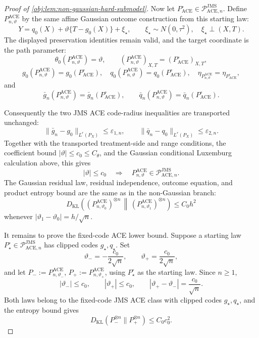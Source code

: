 \documentclass[11pt]{article}
\begin{document}
\begin{proof}[Proof of \cref{obj:lem:non-gaussian-hard-submodel}]
Now let \(P_{\mathrm{ACE}}^\circ\in\mathcal P_{\mathrm{ACE},n}^{\mathrm{JMS}}\).  Define \(P_{n,\vartheta}^{\mathrm{ACE}}\) by the same affine Gaussian outcome construction from this starting law:
\[
Y=q_0(X)+\vartheta\{T-g_0(X)\}+\xi_\star,
\qquad
\xi_\star\sim N(0,\tau^2),\quad \xi_\star\perp(X,T).
\]
The displayed preservation identities remain valid, and the target coordinate is the path parameter:
\[
\theta_0(P_{n,\vartheta}^{\mathrm{ACE}})=\vartheta,
\qquad
(P_{n,\vartheta}^{\mathrm{ACE}})_{X,T}=(P_{\mathrm{ACE}}^\circ)_{X,T},
\]
\[
g_0(P_{n,\vartheta}^{\mathrm{ACE}})=g_0(P_{\mathrm{ACE}}^\circ),\quad
q_0(P_{n,\vartheta}^{\mathrm{ACE}})=q_0(P_{\mathrm{ACE}}^\circ),\quad
\eta_{P_{n,\vartheta}^{\mathrm{ACE}}}=\eta_{P_{\mathrm{ACE}}^\circ},
\]
and
\[
\bar g_n(P_{n,\vartheta}^{\mathrm{ACE}})=\bar g_n(P_{\mathrm{ACE}}^\circ),
\qquad
\bar q_n(P_{n,\vartheta}^{\mathrm{ACE}})=\bar q_n(P_{\mathrm{ACE}}^\circ).
\]

Consequently the two JMS ACE code-radius inequalities are transported unchanged:
\[
\|\bar g_n-g_0\|_{L^r(P_X)}\le\varepsilon_{1,n},
\qquad
\|\bar q_n-q_0\|_{L^r(P_X)}\le\varepsilon_{2,n}.
\]
Together with the transported treatment-side and range conditions, the coefficient bound \(|\vartheta|\le c_0\le C_{\theta}\), and the Gaussian conditional Luxemburg calculation above, this gives
\[
|\vartheta|\le c_0
\quad\Longrightarrow\quad
P_{n,\vartheta}^{\mathrm{ACE}}\in
\mathcal P_{\mathrm{ACE},n}^{\mathrm{JMS}} .
\]
The Gaussian residual law, residual independence, outcome equation, and product entropy bound are the same as in the non-Gaussian branch:
\[
D_{\mathrm{KL}}\!\left((P_{n,\vartheta_0}^{\mathrm{ACE}})^{\otimes n}\,\middle\|\,(P_{n,\vartheta_1}^{\mathrm{ACE}})^{\otimes n}\right)
\le C_0h^2
\]
whenever \(|\vartheta_1-\vartheta_0|=h/\sqrt n\). %

It remains to prove the fixed-code ACE lower bound.  Suppose a starting law \(P_\star^\circ\in\mathcal P_{\mathrm{ACE},n}^{\mathrm{JMS}}\) has clipped codes \(g_\star,q_\star\).  Set
\[
\vartheta_-=-\frac{c_0}{2\sqrt n},
\qquad
\vartheta_+=\frac{c_0}{2\sqrt n},
\]
and let \(P_-:=P_{n,\vartheta_-}^{\mathrm{ACE}}\), \(P_+:=P_{n,\vartheta_+}^{\mathrm{ACE}}\), using \(P_\star^\circ\) as the starting law.  Since \(n\ge1\),
\[
|\vartheta_-|\le c_0,
\qquad |\vartheta_+|\le c_0,
\qquad
|\vartheta_+-\vartheta_-|=\frac{c_0}{\sqrt n}.
\]
Both laws belong to the fixed-code JMS ACE class with clipped codes \(g_\star,q_\star\), and the entropy bound gives
\[
D_{\mathrm{KL}}(P_-^{\otimes n}\|P_+^{\otimes n})
\le C_0c_0^2.
\]


\end{proof}
\end{document}
